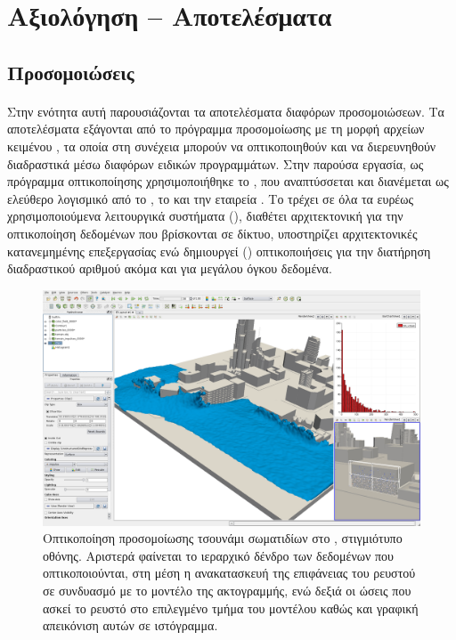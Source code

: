 \section{Αξιολόγηση -- Αποτελέσματα}

\subsection{Προσομοιώσεις}

\paragraph{} Στην ενότητα αυτή παρουσιάζονται τα αποτελέσματα διαφόρων προσομοιώσεων. Τα
αποτελέσματα εξάγονται από το πρόγραμμα προσομοίωσης με τη μορφή αρχείων κειμένου
, τα οποία στη συνέχεια μπορούν να οπτικοποιηθούν και να διερευνηθούν διαδραστικά
μέσω διαφόρων ειδικών προγραμμάτων. Στην παρούσα εργασία, ως πρόγραμμα οπτικοποίησης
χρησιμοποιήθηκε το , που αναπτύσσεται και διανέμεται ως ελεύθερο λογισμικό
από το , το  και την
εταιρεία . Το  τρέχει σε όλα τα ευρέως χρησιμοποιούμενα
λειτουργικά συστήματα (), διαθέτει αρχιτεκτονική
 για την οπτικοποίηση δεδομένων που βρίσκονται σε δίκτυο, υποστηρίζει
αρχιτεκτονικές κατανεμημένης επεξεργασίας ενώ δημιουργεί  ()
οπτικοποιήσεις για την διατήρηση διαδραστικού αριθμού  ακόμα και για μεγάλου
όγκου δεδομένα.

\begin{figure}
  \centering
  \includegraphics[width=\textwidth]{figures/paraview-interface.png}
  \caption[Οπτικοποίηση προσομοίωσης] {Οπτικοποίηση προσομοίωσης τσουνάμι 
    σωματιδίων στο , στιγμιότυπο οθόνης. Αριστερά φαίνεται το ιεραρχικό
    δένδρο των δεδομένων που οπτικοποιούνται, στη μέση η ανακατασκευή της επιφάνειας του
    ρευστού σε συνδυασμό με το μοντέλο της ακτογραμμής, ενώ δεξιά οι ώσεις που ασκεί το
    ρευστό στο επιλεγμένο τμήμα του μοντέλου καθώς και γραφική απεικόνιση αυτών σε
    ιστόγραμμα.}
  \label{fig:paraview-interface}
\end{figure}

